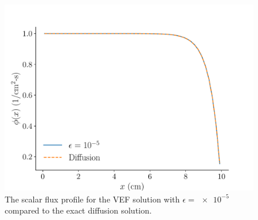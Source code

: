 	\begin{figure}
		\centering
		\includegraphics[width=.75\textwidth]{figs/profile.pdf}
		\caption{The scalar flux profile for the VEF solution with $\epsilon=\num{e-5}$ compared to the exact diffusion solution. }
		\label{fig:flux_profiles}
	\end{figure}